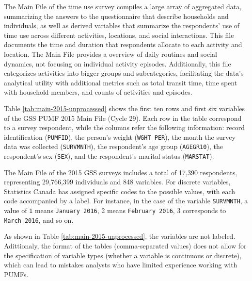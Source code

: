 \documentclass[Royal,times,sageh]{sagej}
\begin{document}
The Main File of the time use survey compiles a large array of
aggregated data, summarizing the answers to the questionnaire that
describe households and individuals, as well as derived variables that
summarize the respondents' use of time use across different activities,
locations, and social interactions. This file documents the time and
duration that respondents allocate to each activity and location. The
Main File provides a overview of daily routines and social dynamics, not
focusing on individual activity episodes. Additionally, this file
categorizes activities into bigger groups and subcategories,
facilitating the data's analytical utility with additional metrics such
as total transit time, time spent with household members, and counts of
activities and episodes.

Table \ref{tab:main-2015-unprocessed} shows the first ten rows and first
six variables of the GSS PUMF 2015 Main File (Cycle 29). Each row in the
table correspond to a survey respondent, while the columns refer the
following information: record identification (\texttt{PUMFID}), the
person's weight (\texttt{WGHT\_PER}), the month the survey data was
collected (\texttt{SURVMNTH}), the respondent's age group
(\texttt{AGEGR10}), the respondent's sex (\texttt{SEX}), and the
respondent's marital status (\texttt{MARSTAT}).

The Main File of the 2015 GSS surveys includes a total of 17,390
respondents, representing 29,766,399 individuals and 848 variables. For
discrete variables, Statistics Canada has assigned specific codes to the
possible values, with each code accompanied by a label. For instance, in
the case of the variable \texttt{SURVMNTH}, a value of \texttt{1} means
\texttt{January\ 2016}, 2 means \texttt{February\ 2016}, 3 corresponds
to \texttt{March\ 2016}, and so on.

As shown in Table \ref{tab:main-2015-unprocessed}, the variables are not
labeled. Adittionaly, the format of the tables (comma-separated values)
does not allow for the specification of variable types (whether a
variable is continuous or discrete), which can lead to mistakes analysts
who have limited experience working with PUMFs.

\begingroup\fontsize{8}{10}\selectfont
\end{document}
